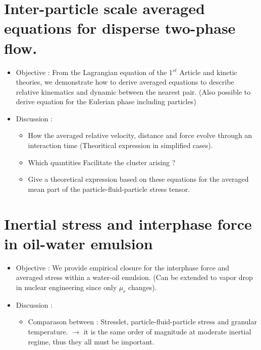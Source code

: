 \documentclass[12pt]{book}
\begin{document}
\section{Inter-particle scale averaged equations for disperse two-phase flow.}
\begin{itemize}
    \item Objective : From the Lagrangian equation of the 1$^{st}$ Article and kinetic theories, we demonstrate how to derive averaged equations to describe relative kinematics   and dynamic between the nearest pair.  
    (Also possible to derive equation for the Eulerian  phase including particles)
    \item Discussion : 
    \begin{itemize}
        \item How the averaged relative velocity, distance and force evolve through an interaction time (Theoritical expression in simplified cases). 
        \item Which quantities Facilitate the cluster arising ? 
        \item Give a theoretical expression based on these equations for the averaged mean part of the particle-fluid-particle stress tensor. 
    \end{itemize}
\end{itemize}
\section{Inertial stress and interphase force in oil-water emulsion}
\begin{itemize}
    \item Objective : We provide empirical closure for the interphase force and averaged stress within a water-oil emulsion. 
    (Can be extended to vapor drop in nuclear engineering since only $\mu_r$ changes). 
    \item Discussion : 
    \begin{itemize}
        \item Comparason between : Stresslet, particle-fluid-particle stress and granular temperature. $\rightarrow$ it is the same order of magnitude at moderate inertial regime, thus they all must be important. 
    \end{itemize}
\end{itemize}
\end{document}
